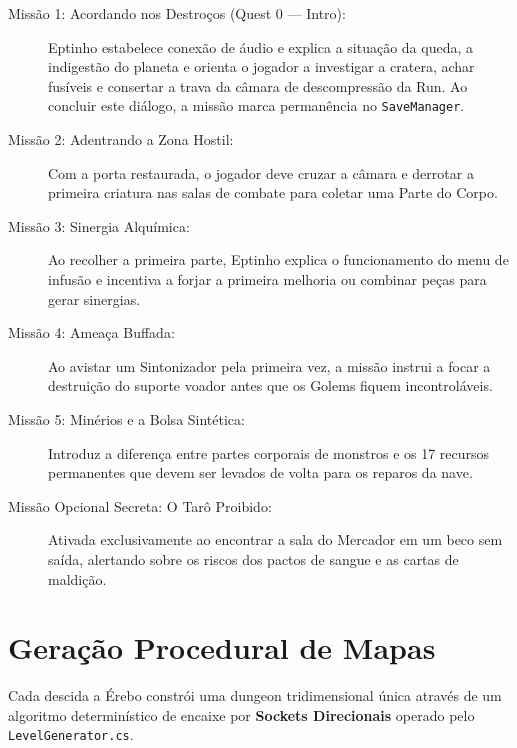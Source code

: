 \documentclass[a4paper,12pt]{report}
\begin{document}
\begin{description}
    \item[Missão 1: Acordando nos Destroços (Quest 0 --- Intro):] Eptinho estabelece conexão de áudio e explica a situação da queda, a indigestão do planeta e orienta o jogador a investigar a cratera, achar fusíveis e consertar a trava da câmara de descompressão da Run. Ao concluir este diálogo, a missão marca permanência no \texttt{SaveManager}.
    \item[Missão 2: Adentrando a Zona Hostil:] Com a porta restaurada, o jogador deve cruzar a câmara e derrotar a primeira criatura nas salas de combate para coletar uma Parte do Corpo.
    \item[Missão 3: Sinergia Alquímica:] Ao recolher a primeira parte, Eptinho explica o funcionamento do menu de infusão e incentiva a forjar a primeira melhoria ou combinar peças para gerar sinergias.
    \item[Missão 4: Ameaça Buffada:] Ao avistar um Sintonizador pela primeira vez, a missão instrui a focar a destruição do suporte voador antes que os Golems fiquem incontroláveis.
    \item[Missão 5: Minérios e a Bolsa Sintética:] Introduz a diferença entre partes corporais de monstros e os 17 recursos permanentes que devem ser levados de volta para os reparos da nave.
    \item[Missão Opcional Secreta: O Tarô Proibido:] Ativada exclusivamente ao encontrar a sala do Mercador em um beco sem saída, alertando sobre os riscos dos pactos de sangue e as cartas de maldição.
\end{description}

\chapter{Geração Procedural de Mapas}\label{cap:geracao}

Cada descida a Érebo constrói uma dungeon tridimensional única através de um algoritmo determinístico de encaixe por \textbf{Sockets Direcionais} operado pelo \texttt{LevelGenerator.cs}.
\end{document}
